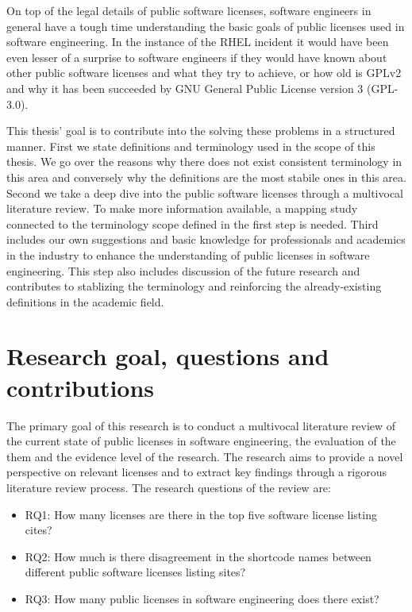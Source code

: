 On top of the legal details of public software licenses, software engineers in general have a tough time understanding the basic goals of public licenses used in software engineering. In the instance of the RHEL incident it would have been even lesser of a  surprise to software engineers if they would have known about other public software licenses and what they try to achieve, or how old is GPLv2 and why it has been succeeded by GNU General Public License version 3 (GPL-3.0).

This thesis' goal is to contribute into the solving these problems in a structured manner. First we state definitions and terminology used in the scope of this thesis. We go over the reasons why there does not exist consistent terminology in this area and conversely why the definitions are the most stabile ones in this area. Second we take a deep dive into the public software licenses through a multivocal literature review. To make more information available, a mapping study connected to the terminology scope defined in the first step is needed. Third includes our own suggestions and basic knowledge for professionals and academics in the industry to enhance the understanding of public licenses in software engineering. This step also includes discussion of the future research and contributes to stablizing the terminology and reinforcing the already-existing definitions in the academic field.

\section{Research goal, questions and contributions}
The primary goal of this research is to conduct a multivocal literature review of the current state of public licenses in software engineering, the evaluation of the them and the evidence level of the research. The research aims to provide a novel perspective on relevant licenses and to extract key findings through a rigorous literature review process. The research questions of the review are:
\begin{itemize}
	\item RQ1: How many licenses are there in the top five software license listing cites?
	\item RQ2: How much is there disagreement in the shortcode names between different public software licenses listing sites?
	\item RQ3: How many public licenses in software engineering does there exist?
\end{itemize}

